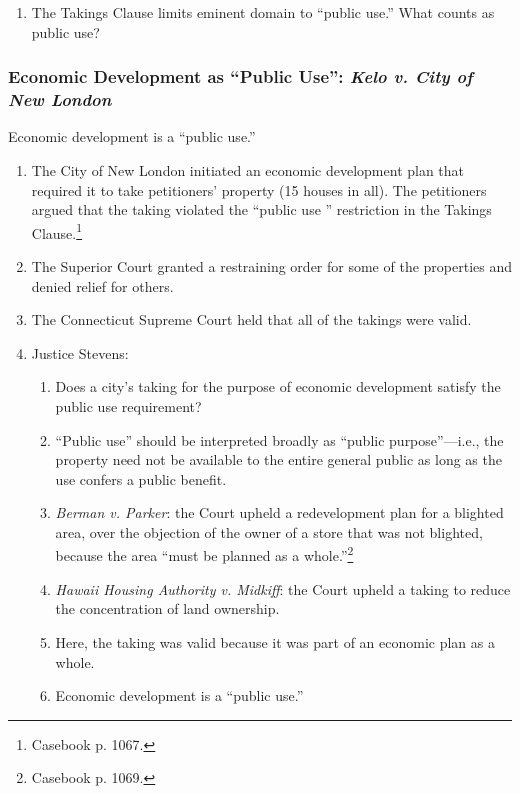 \begin{enumerate}
    \item The Takings Clause limits eminent domain to ``public use.'' What 
    counts as public use?
\end{enumerate}

\subsubsection{Economic Development as ``Public Use'': \emph{Kelo v. City of 
New London}}

Economic development is a ``public use.''
 
\begin{enumerate}
    \item The City of New London initiated an economic development plan that 
    required it to take petitioners' property (15 houses in all). The 
    petitioners argued that the taking violated the ``public use '' 
    restriction in the Takings Clause.\footnote{Casebook p. 1067.}
    \item The Superior Court granted a restraining order for some of the 
    properties and denied relief for others.
    \item The Connecticut Supreme Court held that all of the takings were 
    valid.
    \item Justice Stevens:
    \begin{enumerate}
        \item Does a city's taking for the purpose of economic development 
        satisfy the public use requirement?
        \item ``Public use'' should be interpreted broadly as ``public 
        purpose''---i.e., the property need not be available to the entire 
        general public as long as the use confers a public benefit.
        \item \emph{Berman v. Parker}: the Court upheld a redevelopment plan 
        for a blighted area, over the objection of the owner of a store that 
        was not blighted, because the area ``must be planned as a 
        whole.''\footnote{Casebook p. 1069.}
        \item \emph{Hawaii Housing Authority v. Midkiff}: the Court upheld a 
        taking to reduce the concentration of land ownership.
        \item Here, the taking was valid because it was part of an economic 
        plan as a whole.
        \item Economic development is a ``public use.''

\end{enumerate}
\end{enumerate}
